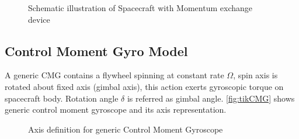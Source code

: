 \begin{figure}[!h]
    \centering
    
    \caption{Schematic illustration of Spacecraft with Momentum exchange device}
    \label{fig:tikSGCMGFrame}
\end{figure}

\subsection{Control Moment Gyro Model}
A generic CMG contains a flywheel spinning at constant rate $\displaystyle \Omega $, spin axis is rotated about fixed axis (gimbal axis), this action exerts gyroscopic torque on spacecraft body. Rotation angle $\displaystyle \delta $ is referred as gimbal angle. \autoref{fig:tikCMG} shows generic control moment gyroscope and its axis representation.
\begin{figure}[!h]
    \centering
    
    \caption{Axis definition for generic Control Moment Gyroscope}
    \label{fig:tikCMG}
\end{figure}



